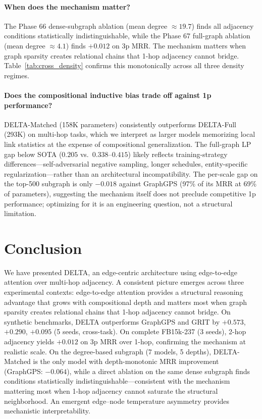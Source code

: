 \documentclass{article}
\begin{document}
\paragraph{When does the mechanism matter?}
The Phase 66 dense-subgraph ablation (mean degree ${\approx}19.7$) finds all adjacency conditions statistically indistinguishable, while the Phase 67 full-graph ablation (mean degree ${\approx}4.1$) finds $+0.012$ on 3p MRR. The mechanism matters when graph sparsity creates relational chains that 1-hop adjacency cannot bridge. Table~\ref{tab:cross_density} confirms this monotonically across all three density regimes.

\paragraph{Does the compositional inductive bias trade off against 1p performance?}
DELTA-Matched (158K parameters) consistently outperforms DELTA-Full (293K) on multi-hop tasks, which we interpret as larger models memorizing local link statistics at the expense of compositional generalization. The full-graph LP gap below SOTA ($0.205$ vs.\ $0.338$--$0.415$) likely reflects training-strategy differences---self-adversarial negative sampling, longer schedules, entity-specific regularization---rather than an architectural incompatibility. The per-scale gap on the top-500 subgraph is only $-0.018$ against GraphGPS (97\% of its MRR at 69\% of parameters), suggesting the mechanism itself does not preclude competitive 1p performance; optimizing for it is an engineering question, not a structural limitation.

\section{Conclusion}
\label{sec:conclusion}

We have presented DELTA, an edge-centric architecture using edge-to-edge attention over multi-hop adjacency. A consistent picture emerges across three experimental contexts: edge-to-edge attention provides a structural reasoning advantage that grows with compositional depth and matters most when graph sparsity creates relational chains that 1-hop adjacency cannot bridge. On synthetic benchmarks, DELTA outperforms GraphGPS and GRIT by $+0.573$, $+0.290$, $+0.095$ (5 seeds, cross-task). On complete FB15k-237 (3 seeds), 2-hop adjacency yields $+0.012$ on 3p MRR over 1-hop, confirming the mechanism at realistic scale. On the degree-based subgraph (7 models, 5 depths), DELTA-Matched is the only model with depth-monotonic MRR improvement (GraphGPS: $-0.064$), while a direct ablation on the same dense subgraph finds conditions statistically indistinguishable---consistent with the mechanism mattering most when 1-hop adjacency cannot saturate the structural neighborhood. An emergent edge--node temperature asymmetry provides mechanistic interpretability.
\end{document}
